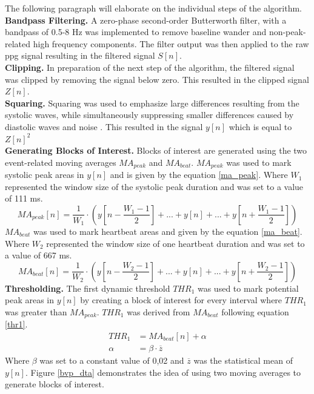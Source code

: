 The following paragraph will elaborate on the individual steps of the algorithm.\\
\textbf{Bandpass Filtering.} A zero-phase second-order Butterworth filter, with a bandpass of 0.5-8 Hz was implemented to remove baseline wander and non-peak-related high frequency components. The filter output was then applied to the raw \gls{ppg} signal resulting in the filtered signal $S[n]$.\\
\textbf{Clipping.} In preparation of the next step of the algorithm, the filtered signal was clipped by removing the signal below zero. This resulted in the clipped signal $Z[n]$.\\
\textbf{Squaring.} Squaring was used to emphasize large differences resulting from the systolic waves, while simultaneously suppressing smaller differences caused by diastolic waves and noise \cite{Elgendi2013}.
This resulted in the signal $y[n]$ which is equal to $Z[n]^{2}$\\
\textbf{Generating Blocks of Interest.} Blocks of interest are generated using the two event-related moving averages $MA_{peak}$ and $MA_{beat}$. $MA_{peak}$ was used to mark systolic peak areas in $y[n]$ and is given by the equation \ref{ma_peak}. Where $W_{1}$ represented the window size of the systolic peak duration and was set to a value of 111 ms.\\
\begin{equation}\label{ma_peak}
MA_{peak}[n] = \frac{1}{W_{1}}\cdot(y[n-\frac{W_{1}-1}{2}]+...+y[n]+...+y[n+\frac{W_{1}-1}{2}])
\end{equation}
$MA_{beat}$ was used to mark heartbeat areas and given by the equation \ref{ma_beat}. Where $W_{2}$ represented the window size of one heartbeat duration and was set to a value of 667 ms.\\
\begin{equation}\label{ma_beat}
MA_{beat}[n] = \frac{1}{W_{2}}\cdot(y[n-\frac{W_{2}-1}{2}]+...+y[n]+...+y[n+\frac{W_{2}-1}{2}])
\end{equation}
\textbf{Thresholding.} The first dynamic threshold $THR_{1}$ was used to mark potential peak areas in $y[n]$ by creating a block of interest for every interval where $THR_{1}$ was greater than $MA_{peak}$. $THR_{1}$ was derived from $MA_{beat}$ following equation \ref{thr1}.
\begin{align} \label{thr1}
THR_{1} &= MA_{beat}[n]+\alpha \\
\alpha &= \beta\cdot\overline{z}
\end{align}
\newpage
Where $\beta$ was set to a constant value of 0,02 and $\overline{z}$ was the statistical mean of $y[n]$. Figure \ref{bvp_dta} demonstrates the idea of using two moving averages to generate blocks of interest.

